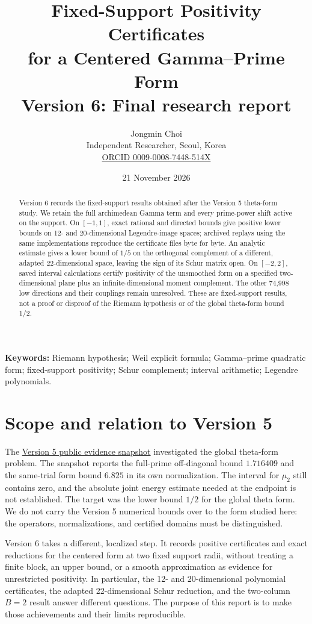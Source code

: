 \documentclass[11pt]{article}
\title{Fixed-Support Positivity Certificates\\for a Centered Gamma--Prime Form\\\large Version 6: Final research report}
\author{Jongmin Choi\\Independent Researcher, Seoul, Korea\\\href{https://orcid.org/0009-0008-7448-514X}{ORCID 0009-0008-7448-514X}}
\date{21 November 2026}
\newcommand{\BaselineURL}{https://github.com/serabing-hash/theta-weighted-certificate/tree/0484eecfc383fe7d4f66b38e91c62ad0002d1338/v5/2026-11-12}
\begin{document}
\maketitle
\begin{abstract}
Version 6 records the fixed-support results obtained after the Version 5 theta-form study. We retain the full archimedean Gamma term and every prime-power shift active on the support. On $[-1,1]$, exact rational and directed bounds give positive lower bounds on 12- and 20-dimensional Legendre-image spaces; archived replays using the same implementations reproduce the certificate files byte for byte. An analytic estimate gives a lower bound of $1/5$ on the orthogonal complement of a different, adapted 22-dimensional space, leaving the sign of its Schur matrix open. On $[-2,2]$, saved interval calculations certify positivity of the unsmoothed form on a specified two-dimensional plane plus an infinite-dimensional moment complement. The other 74,998 low directions and their couplings remain unresolved. These are fixed-support results, not a proof or disproof of the Riemann hypothesis or of the global theta-form bound $1/2$.
\end{abstract}

\noindent\textbf{Keywords:} Riemann hypothesis; Weil explicit formula; Gamma--prime quadratic form; fixed-support positivity; Schur complement; interval arithmetic; Legendre polynomials.

\section{Scope and relation to Version 5}\label{sec:scope}
The \href{\BaselineURL}{Version 5 public evidence snapshot} investigated the global theta-form problem. The snapshot reports the full-prime off-diagonal bound $1.716409$ and the same-trial form bound $6.825$ in its own normalization. The interval for $\mu_2$ still contains zero, and the absolute joint energy estimate needed at the endpoint is not established. The target was the lower bound $1/2$ for the global theta form. We do not carry the Version 5 numerical bounds over to the form studied here: the operators, normalizations, and certified domains must be distinguished.

Version 6 takes a different, localized step. It records positive certificates and exact reductions for the centered form at two fixed support radii, without treating a finite block, an upper bound, or a smooth approximation as evidence for unrestricted positivity. In particular, the 12- and 20-dimensional polynomial certificates, the adapted 22-dimensional Schur reduction, and the two-column $B=2$ result answer different questions. The purpose of this report is to make those achievements and their limits reproducible.
\end{document}
